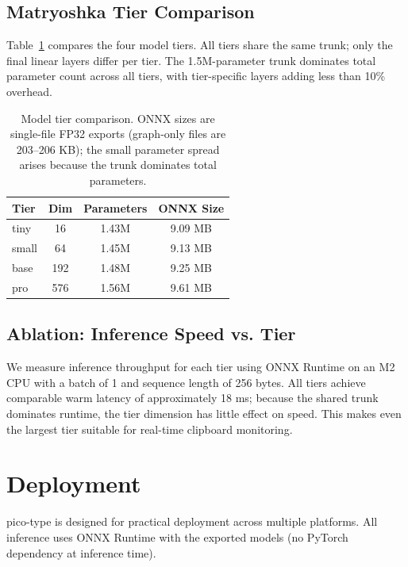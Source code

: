 \documentclass[11pt,a4paper]{article}
\begin{document}
\subsection{Matryoshka Tier Comparison}

Table~\ref{tab:tiers} compares the four model tiers.
All tiers share the same trunk; only the final linear layers differ per tier.
The 1.5M-parameter trunk dominates total parameter count across all tiers, with tier-specific layers adding less than 10\% overhead.

\begin{table}[h]
\centering
\begin{tabular}{lccc}
\toprule
Tier & Dim & Parameters & ONNX Size \\
\midrule
tiny  & 16  & 1.43M & 9.09 MB \\
small & 64  & 1.45M & 9.13 MB \\
base  & 192 & 1.48M & 9.25 MB \\
pro   & 576 & 1.56M & 9.61 MB \\
\bottomrule
\end{tabular}
\caption{\label{tab:tiers} Model tier comparison. ONNX sizes are single-file FP32 exports (graph-only files are 203--206 KB); the small parameter spread arises because the trunk dominates total parameters.}
\end{table}

\subsection{Ablation: Inference Speed vs. Tier}

We measure inference throughput for each tier using ONNX Runtime on an M2 CPU with a batch of 1 and sequence length of 256 bytes.
All tiers achieve comparable warm latency of approximately 18 ms; because the shared trunk dominates runtime, the tier dimension has little effect on speed.
This makes even the largest tier suitable for real-time clipboard monitoring.

\section{Deployment}
\label{sec:deployment}

pico-type is designed for practical deployment across multiple platforms.
All inference uses ONNX Runtime with the exported models (no PyTorch dependency at inference time).
\end{document}
